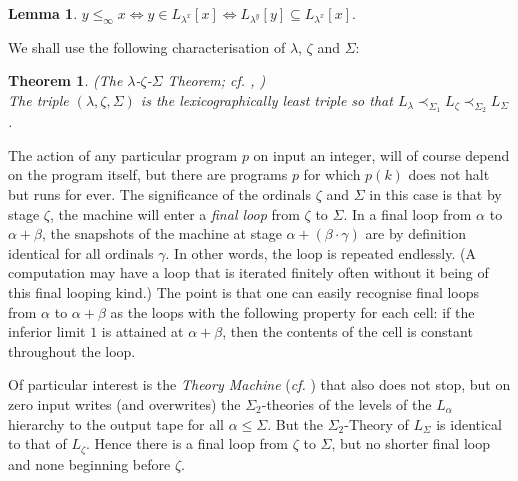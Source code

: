 \documentclass[a4paper,11pt]{amsart}
\theoremstyle{definition}
\newcommand{\Ord}{\mathrm{Ord}}
\newtheorem{theorem}[fact]{Theorem}
\newtheorem{lemma}[fact]{Lemma}
\newtheorem*{problem A}{Problem 1}
\newtheorem*{problem B}{Problem 2}
\theoremstyle{remark}
\begin{document}
\begin{lemma} 
\label{L_lambdax is writable-invariant}  
$y \leq_{\infty}x \Leftrightarrow y\in L_{\lambda^{x}}[x] \Leftrightarrow L_{\lambda^{y}}[y] \subseteq L_{\lambda^{x}}[x]$.
\end{lemma}


We shall use the following characterisation of $\lambda$, $\zeta$ and $\Sigma$: 

\begin{theorem} 
\label{lambda-zeta-Sigma-theorem} 
 {\em (The $\lambda$-$\zeta$-$\Sigma$ Theorem; {\em cf.} \cite{W}, \cite[Corollary 32]{welch2009characteristics}) \\ 
The triple  $(\lambda,\zeta,\Sigma)$ is the lexicographically least triple so that $L_{\lambda}\prec
_{\Sigma_{1}}L_{\zeta}\prec_{\Sigma_{2}}L_{\Sigma}$. }
\end{theorem} 

The action of any particular program $p$ 
on input an integer, will of course depend on the program itself, but there are programs $p$ for which $p(k)$ 
does not halt but runs for ever. The significance of the ordinals $\zeta$ and $\Sigma $ in this case is that by stage $\zeta$, the machine will enter a \emph{final loop} from $\zeta$ to $\Sigma$. 
In a final loop from $\alpha$ to $\alpha+\beta$, the snapshots of the machine at stage $\alpha+(\beta\cdot \gamma)$ are by definition identical for all ordinals $\gamma$. 
In other words, the loop is repeated endlessly. 
(A computation may have a loop that is iterated finitely often without it being of this final looping kind.)
The point is that one can easily recognise final loops from $\alpha$ to $\alpha+\beta$ as the loops with the following property for each cell: if the inferior limit $1$ is attained at $\alpha+\beta$, then the contents of the cell is constant throughout the loop. 

Of particular interest is the \emph{Theory Machine} ({\em cf.} \cite{friedman2007two}) that also does not stop, but on zero input writes (and overwrites) the $\Sigma_{2}$-theories of the levels of the $L_{\alpha}$ hierarchy to the output tape for all $\alpha \leq\Sigma$. But the $\Sigma_{2}$-Theory of $L_{\Sigma}$ is identical to that of $L_{\zeta}$. Hence 
there is a final loop from $\zeta$ to $\Sigma$, but no shorter final loop and none beginning before $\zeta$. 
\end{document}
